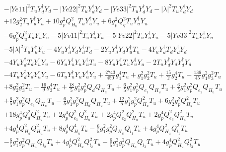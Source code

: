 \begin{align}
 &- |Ye11|^2 {T_u  Y_{d}^{\dagger}  Y_d} - |Ye22|^2 {T_u  Y_{d}^{\dagger}  Y_d} - |Ye33|^2 {T_u  Y_{d}^{\dagger}  Y_d} - |\lambda|^2 {T_u  Y_{d}^{\dagger}  Y_d} \nonumber \\ 
 &+12 g_{2}^{2} {T_u  Y_{u}^{\dagger}  Y_u} +10 g_{p}^{2} Q_{H_u}^{2} {T_u  Y_{u}^{\dagger}  Y_u} +6 g_{p}^{2} Q_{q}^{2} {T_u  Y_{u}^{\dagger}  Y_u} \nonumber \\ 
 &-6 g_{p}^{2} Q_{u}^{2} {T_u  Y_{u}^{\dagger}  Y_u} -5 |Yv11|^2 {T_u  Y_{u}^{\dagger}  Y_u} -5 |Yv22|^2 {T_u  Y_{u}^{\dagger}  Y_u} -5 |Yv33|^2 {T_u  Y_{u}^{\dagger}  Y_u} \nonumber \\ 
 &-5 |\lambda|^2 {T_u  Y_{u}^{\dagger}  Y_u} -4 {Y_u  Y_{d}^{\dagger}  Y_d  Y_{d}^{\dagger}  T_d} -2 {Y_u  Y_{d}^{\dagger}  Y_d  Y_{u}^{\dagger}  T_u} -4 {Y_u  Y_{d}^{\dagger}  T_d  Y_{d}^{\dagger}  Y_d} \nonumber \\ 
 &-4 {Y_u  Y_{d}^{\dagger}  T_d  Y_{u}^{\dagger}  Y_u} -6 {Y_u  Y_{u}^{\dagger}  Y_u  Y_{u}^{\dagger}  T_u} -8 {Y_u  Y_{u}^{\dagger}  T_u  Y_{u}^{\dagger}  Y_u} -2 {T_u  Y_{d}^{\dagger}  Y_d  Y_{d}^{\dagger}  Y_d} \nonumber \\ 
 &-4 {T_u  Y_{d}^{\dagger}  Y_d  Y_{u}^{\dagger}  Y_u} -6 {T_u  Y_{u}^{\dagger}  Y_u  Y_{u}^{\dagger}  Y_u} +\frac{2743}{450} g_{1}^{4} T_u +g_{1}^{2} g_{2}^{2} T_u +\frac{15}{2} g_{2}^{4} T_u +\frac{136}{45} g_{1}^{2} g_{3}^{2} T_u \nonumber \\ 
 &+8 g_{2}^{2} g_{3}^{2} T_u -\frac{16}{9} g_{3}^{4} T_u +\frac{18}{5} g_{1}^{2} g_{p}^{2} Q_{d} Q_{H_u} T_u +\frac{6}{5} g_{1}^{2} g_{p}^{2} Q_{e_{1}} Q_{H_u} T_u +\frac{6}{5} g_{1}^{2} g_{p}^{2} Q_{e_{2}} Q_{H_u} T_u \nonumber \\ 
 &+\frac{6}{5} g_{1}^{2} g_{p}^{2} Q_{e_3} Q_{H_u} T_u -\frac{6}{5} g_{1}^{2} g_{p}^{2} Q_{H_d} Q_{H_u} T_u +\frac{12}{5} g_{1}^{2} g_{p}^{2} Q_{H_u}^{2} T_u +6 g_{2}^{2} g_{p}^{2} Q_{H_u}^{2} T_u \nonumber \\ 
 &+18 g_{p}^{4} Q_{d}^{2} Q_{H_u}^{2} T_u +2 g_{p}^{4} Q_{e_{1}}^{2} Q_{H_u}^{2} T_u +2 g_{p}^{4} Q_{e_{2}}^{2} Q_{H_u}^{2} T_u +2 g_{p}^{4} Q_{e_3}^{2} Q_{H_u}^{2} T_u \nonumber \\ 
 &+4 g_{p}^{4} Q_{H_d}^{2} Q_{H_u}^{2} T_u +8 g_{p}^{4} Q_{H_u}^{4} T_u -\frac{6}{5} g_{1}^{2} g_{p}^{2} Q_{H_u} Q_{l_1} T_u +4 g_{p}^{4} Q_{H_u}^{2} Q_{l_1}^{2} T_u \nonumber \\ 
 &-\frac{6}{5} g_{1}^{2} g_{p}^{2} Q_{H_u} Q_{l_2} T_u +4 g_{p}^{4} Q_{H_u}^{2} Q_{l_2}^{2} T_u -\frac{6}{5} g_{1}^{2} g_{p}^{2} Q_{H_u} Q_{l_3} T_u +4 g_{p}^{4} Q_{H_u}^{2} Q_{l_3}^{2} T_u \nonumber \\ 

\end{align}
